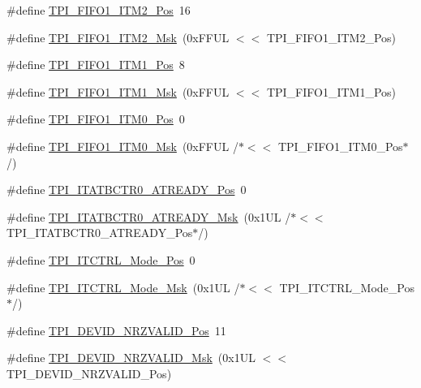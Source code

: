 \begin{DoxyCompactItemize}
\item 
\#define \hyperlink{group___c_m_s_i_s___t_p_i_ga1828c228f3940005f48fb8dd88ada35b}{T\+P\+I\+\_\+\+F\+I\+F\+O1\+\_\+\+I\+T\+M2\+\_\+\+Pos}~16
\item 
\#define \hyperlink{group___c_m_s_i_s___t_p_i_gae54512f926ebc00f2e056232aa21d335}{T\+P\+I\+\_\+\+F\+I\+F\+O1\+\_\+\+I\+T\+M2\+\_\+\+Msk}~(0x\+F\+F\+U\+L $<$$<$ T\+P\+I\+\_\+\+F\+I\+F\+O1\+\_\+\+I\+T\+M2\+\_\+\+Pos)
\item 
\#define \hyperlink{group___c_m_s_i_s___t_p_i_gaece86ab513bc3d0e0a9dbd82258af49f}{T\+P\+I\+\_\+\+F\+I\+F\+O1\+\_\+\+I\+T\+M1\+\_\+\+Pos}~8
\item 
\#define \hyperlink{group___c_m_s_i_s___t_p_i_ga3347f42828920dfe56e3130ad319a9e6}{T\+P\+I\+\_\+\+F\+I\+F\+O1\+\_\+\+I\+T\+M1\+\_\+\+Msk}~(0x\+F\+F\+U\+L $<$$<$ T\+P\+I\+\_\+\+F\+I\+F\+O1\+\_\+\+I\+T\+M1\+\_\+\+Pos)
\item 
\#define \hyperlink{group___c_m_s_i_s___t_p_i_ga2188671488417a52abb075bcd4d73440}{T\+P\+I\+\_\+\+F\+I\+F\+O1\+\_\+\+I\+T\+M0\+\_\+\+Pos}~0
\item 
\#define \hyperlink{group___c_m_s_i_s___t_p_i_ga8ae09f544fc1a428797e2a150f14a4c9}{T\+P\+I\+\_\+\+F\+I\+F\+O1\+\_\+\+I\+T\+M0\+\_\+\+Msk}~(0x\+F\+F\+U\+L /$\ast$$<$$<$ T\+P\+I\+\_\+\+F\+I\+F\+O1\+\_\+\+I\+T\+M0\+\_\+\+Pos$\ast$/)
\item 
\#define \hyperlink{group___c_m_s_i_s___t_p_i_gab1eb6866c65f02fa9c83696b49b0f346}{T\+P\+I\+\_\+\+I\+T\+A\+T\+B\+C\+T\+R0\+\_\+\+A\+T\+R\+E\+A\+D\+Y\+\_\+\+Pos}~0
\item 
\#define \hyperlink{group___c_m_s_i_s___t_p_i_gaee320b3c60f9575aa96a8742c4ff9356}{T\+P\+I\+\_\+\+I\+T\+A\+T\+B\+C\+T\+R0\+\_\+\+A\+T\+R\+E\+A\+D\+Y\+\_\+\+Msk}~(0x1\+U\+L /$\ast$$<$$<$ T\+P\+I\+\_\+\+I\+T\+A\+T\+B\+C\+T\+R0\+\_\+\+A\+T\+R\+E\+A\+D\+Y\+\_\+\+Pos$\ast$/)
\item 
\#define \hyperlink{group___c_m_s_i_s___t_p_i_gaa847adb71a1bc811d2e3190528f495f0}{T\+P\+I\+\_\+\+I\+T\+C\+T\+R\+L\+\_\+\+Mode\+\_\+\+Pos}~0
\item 
\#define \hyperlink{group___c_m_s_i_s___t_p_i_gad6f87550b468ad0920d5f405bfd3f017}{T\+P\+I\+\_\+\+I\+T\+C\+T\+R\+L\+\_\+\+Mode\+\_\+\+Msk}~(0x1\+U\+L /$\ast$$<$$<$ T\+P\+I\+\_\+\+I\+T\+C\+T\+R\+L\+\_\+\+Mode\+\_\+\+Pos$\ast$/)
\item 
\#define \hyperlink{group___c_m_s_i_s___t_p_i_ga9f46cf1a1708575f56d6b827766277f4}{T\+P\+I\+\_\+\+D\+E\+V\+I\+D\+\_\+\+N\+R\+Z\+V\+A\+L\+I\+D\+\_\+\+Pos}~11
\item 
\#define \hyperlink{group___c_m_s_i_s___t_p_i_gacecc8710a8f6a23a7d1d4f5674daf02a}{T\+P\+I\+\_\+\+D\+E\+V\+I\+D\+\_\+\+N\+R\+Z\+V\+A\+L\+I\+D\+\_\+\+Msk}~(0x1\+U\+L $<$$<$ T\+P\+I\+\_\+\+D\+E\+V\+I\+D\+\_\+\+N\+R\+Z\+V\+A\+L\+I\+D\+\_\+\+Pos)
$$
\end{DoxyCompactItemize}
